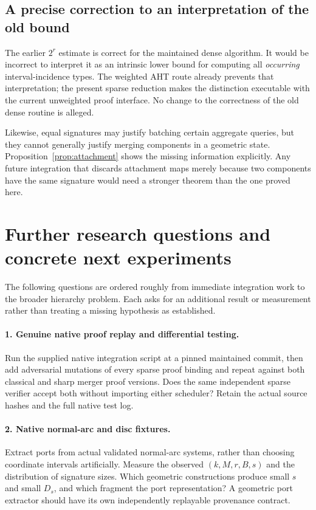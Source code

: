 \documentclass[11pt]{article}
\theoremstyle{definition}
\begin{document}
\subsection{A precise correction to an interpretation of the old bound}
The earlier $2^r$ estimate is correct for the maintained dense algorithm.
It would be incorrect to interpret it as an intrinsic lower bound for
computing all \emph{occurring} interval-incidence types. The weighted AHT
route already prevents that interpretation; the present sparse reduction
makes the distinction executable with the current unweighted proof interface.
No change to the correctness of the old dense routine is alleged.

Likewise, equal signatures may justify batching certain aggregate queries,
but they cannot generally justify merging components in a geometric state.
Proposition~\ref{prop:attachment} shows the missing information explicitly.
Any future integration that discards attachment maps merely because two
components have the same signature would need a stronger theorem than the
one proved here.

\section{Further research questions and concrete next experiments}
\label{sec:future}
The following questions are ordered roughly from immediate integration work
to the broader hierarchy problem. Each asks for an additional result or
measurement rather than treating a missing hypothesis as established.

\paragraph{1. Genuine native proof replay and differential testing.}
Run the supplied native integration script at a pinned maintained commit,
then add adversarial mutations of every sparse proof binding and repeat
against both classical and sharp merger proof versions. Does the same
independent sparse verifier accept both without importing either scheduler?
Retain the actual source hashes and the full native test log.

\paragraph{2. Native normal-arc and disc fixtures.}
Extract ports from actual validated normal-arc systems, rather than choosing
coordinate intervals artificially. Measure the observed $(k,M,r,B,s)$ and
the distribution of signature sizes. Which geometric constructions produce
small $s$ and small $D_s$, and which fragment the port representation?
A geometric port extractor should have its own independently replayable
provenance contract.
\end{document}
